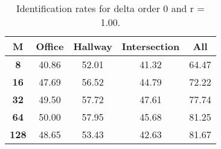 \begin{table}[h]
    \small
    \centering
    \begin{tabular}{|c|c|c|c|l|}    
    \hline
    {\bf M} & {\bf Office} & {\bf Hallway} & {\bf Intersection} &     \multicolumn{1}{c|}{{\bf All}} \\ \hline
    {\bf 8} & 40.86 & 52.01 & 41.32 & 64.47 \\ \hline
    {\bf 16} & 47.69 & 56.52 & 44.79 & 72.22 \\ \hline
    {\bf 32} & 49.50 & 57.72 & 47.61 & 77.74 \\ \hline
    {\bf 64} & 50.00 & 57.95 & 45.68 & 81.25 \\ \hline
    {\bf 128} & 48.65 & 53.43 & 42.63 & 81.67 \\ \hline
    \end{tabular}
    \caption{Identification rates for delta order 0 and r = 1.00.}    
    \label{tab:identify_speakers_1.00_mit_19_0}
\end{table}
